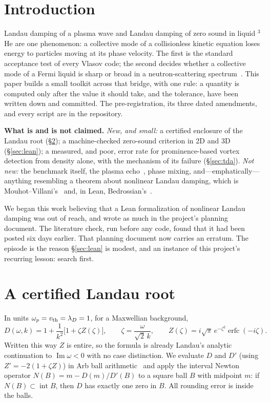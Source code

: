 \documentclass[11pt,a4paper]{article}
\begin{document}
\section{Introduction}

Landau damping of a plasma wave and Landau damping of zero sound in liquid $^3$He are one
phenomenon: a collective mode of a collisionless kinetic equation loses energy to particles moving at
its phase velocity. The first is the standard acceptance test of every Vlasov code; the second decides
whether a collective mode of a Fermi liquid is sharp or broad in a neutron-scattering
spectrum~\cite{Godfrin2012}. This paper builds a small toolkit across that bridge, with one rule: a
quantity is computed only after the value it should take, and the tolerance, have been written down and
committed. The pre-registration, its three dated amendments, and every script are in the repository.

\begin{keybox}
\textbf{What is and is not claimed.} \emph{New, and small:} a certified enclosure of the Landau root
(\S\ref{sec:k1}); a machine-checked zero-sound criterion in 2D and 3D (\S\ref{sec:lean}); a measured, and
poor, error rate for prominence-based vortex detection from density alone, with the mechanism of its
failure (\S\ref{sec:tda}). \emph{Not new:}
the benchmark itself, the plasma echo~\cite{Gould1967}, phase mixing, and---emphatically---anything
resembling a theorem about nonlinear Landau damping, which is
Mouhot--Villani's~\cite{MouhotVillani2011} and, in Lean, Bedrossian's~\cite{Bedrossian2026}.
\end{keybox}

We began this work believing that a Lean formalization of nonlinear Landau damping was out of reach, and
wrote as much in the project's planning document. The literature check, run before any code, found that
it had been posted six days earlier. That planning document now carries an erratum. The episode is the
reason \S\ref{sec:lean} is modest, and an instance of this project's recurring lesson: search first.

\section{A certified Landau root}
\label{sec:k1}

In units $\omega_p=v_{\rm th}=\lambda_D=1$, for a Maxwellian background,
\begin{equation}
D(\omega,k) = 1+\frac{1}{k^2}\bigl[1+\zeta Z(\zeta)\bigr],\qquad \zeta=\frac{\omega}{\sqrt2\,k},\qquad
Z(\zeta) = i\sqrt{\pi}\,e^{-\zeta^2}\operatorname{erfc}(-i\zeta).
\end{equation}
Written this way $Z$ is entire, so the formula is already Landau's analytic continuation to
$\operatorname{Im}\omega<0$ with no case distinction. We evaluate $D$ and $D'$ (using
$Z'=-2(1+\zeta Z)$) in Arb ball arithmetic~\cite{Arb} and apply the interval Newton operator
$N(B)=m-D(m)/D'(B)$ to a square ball $B$ with midpoint $m$: if $N(B)\subset\operatorname{int}B$, then $D$
has exactly one zero in $B$. All rounding error is inside the balls.
\end{document}
